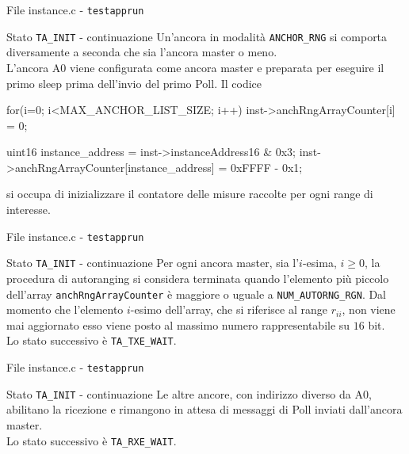 \begin{frame}[fragile]{File instance.c - \lstinline[language=C]!testapprun!}
  \begin{block}{Stato \lstinline[language=C]!TA_INIT! - continuazione}
    Un'ancora in modalità \lstinline[language=C]!ANCHOR_RNG! si comporta diversamente a seconda che sia l'ancora master o meno.\\
    L'ancora A0 viene configurata come ancora master e preparata per eseguire il primo sleep prima dell'invio del primo Poll.
    Il codice
    \begin{C}
      for(i=0; i<MAX_ANCHOR_LIST_SIZE; i++)
          inst->anchRngArrayCounter[i] = 0;
      
      uint16 instance_address = inst->instanceAddress16 & 0x3;
      inst->anchRngArrayCounter[instance_address] = 0xFFFF - 0x1;
    \end{C}
    si occupa di inizializzare il contatore delle misure raccolte per ogni range di interesse.
  \end{block}
\end{frame}


\begin{frame}[fragile]{File instance.c - \lstinline[language=C]!testapprun!}
  \begin{block}{Stato \lstinline[language=C]!TA_INIT! - continuazione}
    Per ogni ancora master, sia l'$i$-esima, $i \ge 0$, la procedura di autoranging si considera terminata
    quando l'elemento più piccolo dell'array \lstinline[language=C]!anchRngArrayCounter! è maggiore o uguale a
    \lstinline[language=C]!NUM_AUTORNG_RGN!. Dal momento che l'elemento $i$-esimo dell'array, che si riferisce al range
    $r_{ii}$, non viene mai aggiornato esso viene posto al massimo numero rappresentabile su $16$ bit.\\
    \alert{Lo stato successivo} è \lstinline[language=C]!TA_TXE_WAIT!.
  \end{block}
\end{frame}

\begin{frame}[fragile]{File instance.c - \lstinline[language=C]!testapprun!}
  \begin{block}{Stato \lstinline[language=C]!TA_INIT! - continuazione}
    Le altre ancore, con indirizzo diverso da A0, abilitano la ricezione
    e rimangono in attesa di messaggi di Poll inviati dall'ancora master.\\
    \alert{Lo stato successivo} è \lstinline[language=C]!TA_RXE_WAIT!.
  \end{block}
\end{frame}


